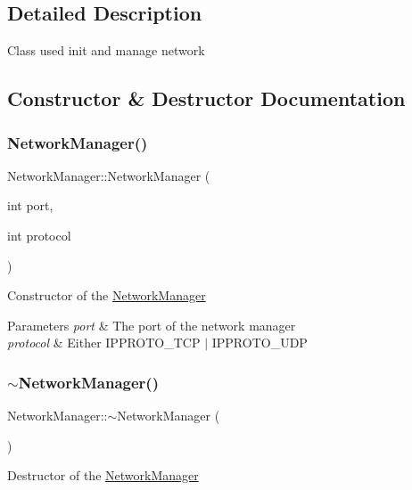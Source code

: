 \subsection{Detailed Description}
Class used init and manage network 

\subsection{Constructor \& Destructor Documentation}
\mbox{\label{classNetworkManager_a326a7681ace2029fa6a606def54c066e}} 
\subsubsection{\texorpdfstring{NetworkManager()}{NetworkManager()}}
{\footnotesize\ttfamily Network\+Manager\+::\+Network\+Manager (\begin{DoxyParamCaption}\item[{int}]{port,  }\item[{int}]{protocol }\end{DoxyParamCaption})}

Constructor of the \mbox{\hyperlink{classNetworkManager}{Network\+Manager}} 
\begin{DoxyParams}{Parameters}
{\em port} & The port of the network manager \\
\hline
{\em protocol} & Either I\+P\+P\+R\+O\+T\+O\+\_\+\+T\+CP $\vert$ I\+P\+P\+R\+O\+T\+O\+\_\+\+U\+DP \\
\hline
\end{DoxyParams}
\mbox{\label{classNetworkManager_a2cfe4223139cf58587a9f066b956cb23}} 
\subsubsection{\texorpdfstring{$\sim$NetworkManager()}{~NetworkManager()}}
{\footnotesize\ttfamily Network\+Manager\+::$\sim$\+Network\+Manager (\begin{DoxyParamCaption}{ }\end{DoxyParamCaption})}

Destructor of the \mbox{\hyperlink{classNetworkManager}{Network\+Manager}} 


